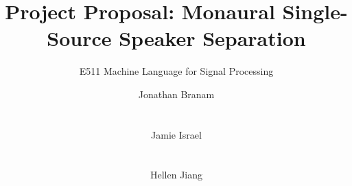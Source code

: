 \documentclass{e511-project}
\begin{document}
%

\title{Project Proposal: Monaural Single-Source Speaker Separation}
\subtitle{E511 Machine Language for Signal Processing}
%
%
%
%
%

%
\author{
%
%
\alignauthor
Jonathan Branam\\
       \\
       \\
\alignauthor
Jamie Israel\\
       \\
       \\
\alignauthor
Hellen Jiang\\
       \\
       \\
}
\end{document}
